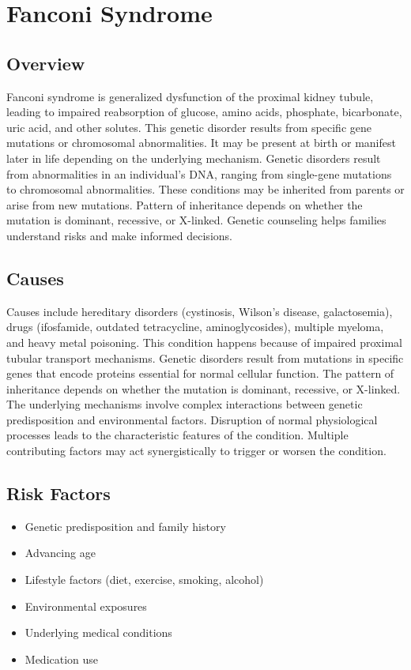 \chapter{Fanconi Syndrome}
\label{sec:Fanconi Syndrome}

\section{Overview}
Fanconi syndrome is generalized dysfunction of the proximal kidney tubule, leading to impaired reabsorption of glucose, amino acids, phosphate, bicarbonate, uric acid, and other solutes. This genetic disorder results from specific gene mutations or chromosomal abnormalities. It may be present at birth or manifest later in life depending on the underlying mechanism. Genetic disorders result from abnormalities in an individual's DNA, ranging from single-gene mutations to chromosomal abnormalities. These conditions may be inherited from parents or arise from new mutations. Pattern of inheritance depends on whether the mutation is dominant, recessive, or X-linked. Genetic counseling helps families understand risks and make informed decisions.
\section{Causes}
Causes include hereditary disorders (cystinosis, Wilson's disease, galactosemia), drugs (ifosfamide, outdated tetracycline, aminoglycosides), multiple myeloma, and heavy metal poisoning. This condition happens because of impaired proximal tubular transport mechanisms. Genetic disorders result from mutations in specific genes that encode proteins essential for normal cellular function. The pattern of inheritance depends on whether the mutation is dominant, recessive, or X-linked. The underlying mechanisms involve complex interactions between genetic predisposition and environmental factors. Disruption of normal physiological processes leads to the characteristic features of the condition. Multiple contributing factors may act synergistically to trigger or worsen the condition.
\section{Risk Factors}


\begin{itemize}[noitemsep]
  \item Genetic predisposition and family history
  \item Advancing age
  \item Lifestyle factors (diet, exercise, smoking, alcohol)
  \item Environmental exposures
  \item Underlying medical conditions
  \item Medication use
\end{itemize}
